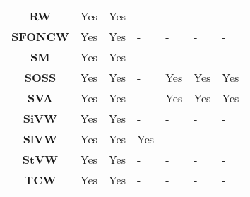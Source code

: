 \begin{table}[ht!]
\begin{tabular}{cllllll}
\textbf{RW}          & Yes                                 & Yes                                 & -                                       & -                                        & -                                         & -                                         \\
\textbf{SFONCW}      & Yes                                 & Yes                                 & -                                       & -                                        & -                                         & -                                         \\
\textbf{SM}          & Yes                                 & Yes                                 & -                                       & -                                        & -                                         & -                                         \\
\textbf{SOSS}        & Yes                                 & Yes                                 & -                                       & Yes                                      & Yes                                       & Yes                                       \\
\textbf{SVA}         & Yes                                 & Yes                                 & -                                       & Yes                                      & Yes                                       & Yes                                       \\
\textbf{SiVW}        & Yes                                 & Yes                                 & -                                       & -                                        & -                                         & -                                         \\
\textbf{SlVW}        & Yes                                 & Yes                                 & Yes                                     & -                                        & -                                         & -                                         \\
\textbf{StVW}        & Yes                                 & Yes                                 & -                                       & -                                        & -                                         & -                                         \\
\textbf{TCW}         & Yes                                 & Yes                                 & -                                       & -                                        & -                                         & -                                         \\

\end{tabular}
\end{table}
